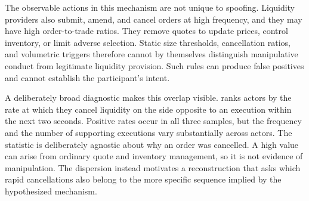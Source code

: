 \documentclass[11pt]{article}
\newenvironment{review}{\begingroup\color{blue}}{\endgroup}
\begin{document}
The observable actions in this mechanism are not unique to spoofing. Liquidity providers also submit, amend, and cancel
orders at high frequency, and they may have high order-to-trade ratios. They remove quotes to update prices,
control inventory, or limit adverse selection. Static size thresholds, cancellation ratios, and volumetric triggers
therefore cannot by themselves distinguish manipulative conduct from legitimate liquidity provision. Such rules can
produce false positives and cannot establish the participant's intent.

\begin{review}
A deliberately broad diagnostic makes this overlap visible.  ranks actors by the rate at
which they cancel liquidity on the side opposite to an execution within the next two seconds. Positive rates occur in all
three samples, but the frequency and the number of supporting executions vary substantially across actors. The
statistic is deliberately agnostic about why an order was cancelled. A high value can arise from ordinary quote and
inventory management, so it is not evidence of manipulation. The dispersion instead motivates a reconstruction that asks
which rapid cancellations also belong to the more specific sequence implied by the hypothesized mechanism.
\end{review}
\end{document}
